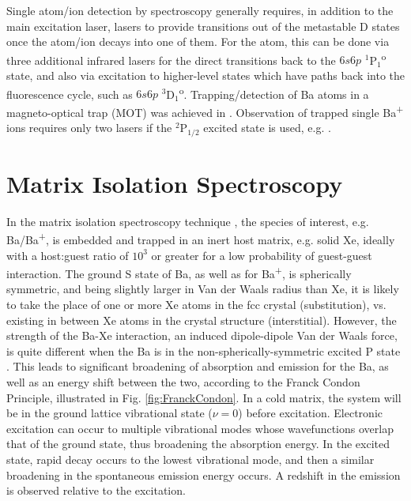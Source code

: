 

Single atom/ion detection by spectroscopy generally requires, in addition to the main excitation laser, lasers to provide transitions out of the metastable D states once the atom/ion decays into one of them.  For the atom, this can be done via three additional infrared lasers for the direct transitions back to the $6s6p$ $^{1}$P$_{1}$\textsuperscript{o} state, and also via excitation to higher-level states which have paths back into the fluorescence cycle, such as $6s6p$ $^{3}$D$_{1}$\textsuperscript{o}.  Trapping/detection of Ba atoms in a magneto-optical trap (MOT) was achieved in \cite{BaMOT}.  Observation of trapped single Ba\textsuperscript{+} ions requires only two lasers if the $^{2}$P$_{1/2}$ excited state is used, e.g. \cite{singleBaPlusEXO}.

\section{Matrix Isolation Spectroscopy}


In the matrix isolation spectroscopy technique \cite{matrixIso}, the species of interest, e.g. Ba/Ba\textsuperscript{+}, is embedded and trapped in an inert host matrix, e.g. solid Xe, ideally with a host:guest ratio of $10^{3}$ or greater for a low probability of guest-guest interaction.  The ground S state of Ba, as well as for Ba\textsuperscript{+}, is spherically symmetric, and being slightly larger in Van der Waals radius than Xe, it is likely to take the place of one or more Xe atoms in the fcc crystal (substitution), vs. existing in between Xe atoms in the crystal structure (interstitial).  However, the strength of the Ba-Xe interaction, an induced dipole-dipole Van der Waals force, is quite different when the Ba is in the non-spherically-symmetric excited P state \cite{crepin}.  This leads to significant broadening of absorption and emission for the Ba, as well as an energy shift between the two, according to the Franck Condon Principle, illustrated in Fig. \ref{fig:FranckCondon}.  In a cold matrix, the system will be in the ground lattice vibrational state ($\nu =0$) before excitation.  Electronic excitation can occur to multiple vibrational modes whose wavefunctions overlap that of the ground state, thus broadening the absorption energy.  In the excited state, rapid decay occurs to the lowest vibrational mode, and then a similar broadening in the spontaneous emission energy occurs.  A redshift in the emission is observed relative to the excitation.

